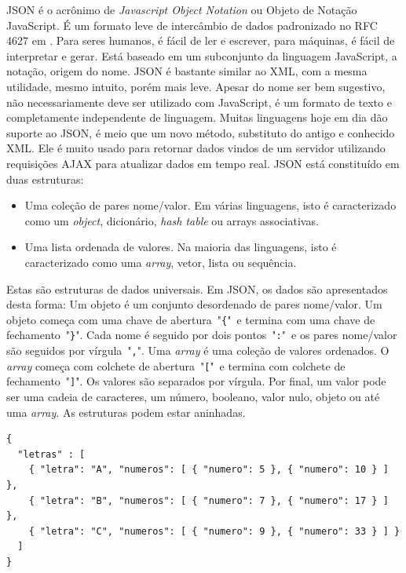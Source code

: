 JSON é o acrônimo de \textit{Javascript Object Notation} ou Objeto de Notação JavaScript. É um formato leve de intercâmbio de dados padronizado no RFC 4627 em . Para seres humanos, é fácil de ler e escrever, para máquinas, é fácil de interpretar e gerar. Está baseado em um subconjunto da linguagem JavaScript, a notação, origem do nome. JSON é bastante similar ao XML, com a mesma utilidade, mesmo intuito, porém mais leve. Apesar do nome ser bem sugestivo, não necessariamente deve ser utilizado com JavaScript, é um formato de texto e completamente independente de linguagem. Muitas linguagens hoje em dia dão suporte ao JSON, é meio que um novo método, substituto do antigo e conhecido XML. Ele é muito usado para retornar dados vindos de um servidor utilizando requisições AJAX para atualizar dados em tempo real. JSON está constituído em duas estruturas:
\begin{itemize}
    \item Uma coleção de pares nome/valor. Em várias linguagens, isto é caracterizado como um \textit{object}, dicionário, \textit{hash table} ou arrays associativas.
    \item Uma lista ordenada de valores. Na maioria das linguagens, isto é caracterizado como uma \textit{array}, vetor, lista ou sequência.
\end{itemize}

Estas são estruturas de dados universais. Em JSON, os dados são apresentados desta forma: Um objeto é um conjunto desordenado de pares nome/valor. Um objeto começa com uma chave de abertura~"\texttt{\{}"~e termina com uma chave de fechamento~"\texttt{\}}". Cada nome é seguido por dois pontos~"\texttt{:}"~e os pares nome/valor são seguidos por vírgula~"\texttt{,}". Uma \textit{array} é uma coleção de valores ordenados. O \textit{array} começa com colchete de abertura~"\texttt{[}"~e termina com colchete de fechamento~"\texttt{]}". Os valores são separados por vírgula. Por final, um valor pode ser uma cadeia de caracteres, um número, booleano, valor nulo, objeto ou até uma \textit{array}. As estruturas podem estar aninhadas.

\begin{lstlisting}[label=basejson,caption=Exemplo de um arquivo JSON.]
{
  "letras" : [
    { "letra": "A", "numeros": [ { "numero": 5 }, { "numero": 10 } ] },
    { "letra": "B", "numeros": [ { "numero": 7 }, { "numero": 17 } ] },
    { "letra": "C", "numeros": [ { "numero": 9 }, { "numero": 33 } ] }
  ]
}
\end{lstlisting}

